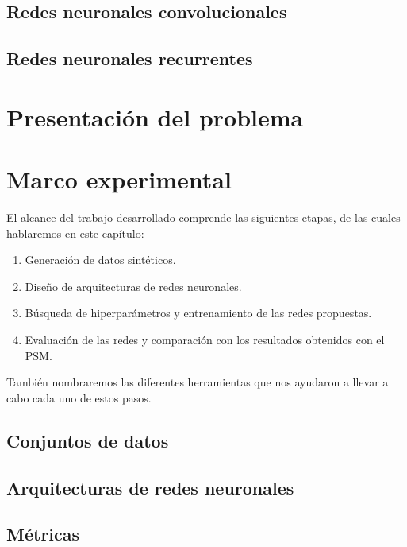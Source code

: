\documentclass[a4paper,12pt,spanish]{book}
\begin{document}
\section{Redes neuronales convolucionales}


\section{Redes neuronales recurrentes}



\chapter{Presentación del problema} \label{chap:problema}



\chapter{Marco experimental}
El alcance del trabajo desarrollado comprende las siguientes etapas, de las cuales
hablaremos en este capítulo:
\begin{enumerate}[itemsep=0.1cm, label=\textbf{\arabic*.}]
    \item Generación de datos sintéticos.
    \item Diseño de arquitecturas de redes neuronales.
    \item Búsqueda de hiperparámetros y entrenamiento de las redes propuestas.
    \item Evaluación de las redes y comparación con los resultados obtenidos con el PSM.
\end{enumerate}

También nombraremos las diferentes herramientas que nos ayudaron a llevar a cabo
cada uno de estos pasos.

\section{Conjuntos de datos} \label{sec:datos}


\section{Arquitecturas de redes neuronales}


\section{Métricas} \label{sec:metricas}

\end{document}
